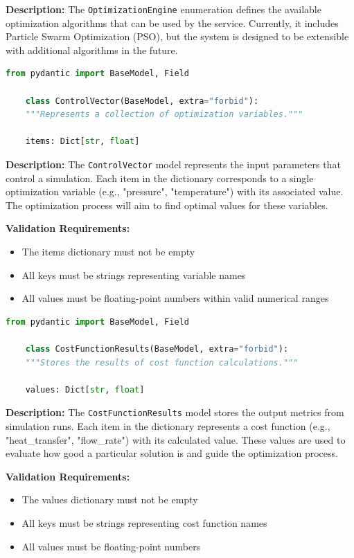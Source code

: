\textbf{Description:}
The \texttt{OptimizationEngine} enumeration defines the available optimization algorithms that can be used by the service. Currently, it includes Particle Swarm Optimization (PSO), but the system is designed to be extensible with additional algorithms in the future.

\begin{lstlisting}[language=Python, caption={ControlVector model definition}]
	from pydantic import BaseModel, Field
	
	class ControlVector(BaseModel, extra="forbid"):
	"""Represents a collection of optimization variables."""
	
	items: Dict[str, float]
\end{lstlisting}

\textbf{Description:}
The \texttt{ControlVector} model represents the input parameters that control a simulation. Each item in the dictionary corresponds to a single optimization variable (e.g., "pressure", "temperature") with its associated value. The optimization process will aim to find optimal values for these variables.

\textbf{Validation Requirements:}
\begin{itemize}
	\item The items dictionary must not be empty
	\item All keys must be strings representing variable names
	\item All values must be floating-point numbers within valid numerical ranges
\end{itemize}

\begin{lstlisting}[language=Python, caption={CostFunctionResults model definition}]
	from pydantic import BaseModel, Field
	
	class CostFunctionResults(BaseModel, extra="forbid"):
	"""Stores the results of cost function calculations."""
	
	values: Dict[str, float]
\end{lstlisting}

\textbf{Description:}
The \texttt{CostFunctionResults} model stores the output metrics from simulation runs. Each item in the dictionary represents a cost function (e.g., "heat\_transfer", "flow\_rate") with its calculated value. These values are used to evaluate how good a particular solution is and guide the optimization process.

\textbf{Validation Requirements:}
\begin{itemize}
	\item The values dictionary must not be empty
	\item All keys must be strings representing cost function names
	\item All values must be floating-point numbers
\end{itemize}


